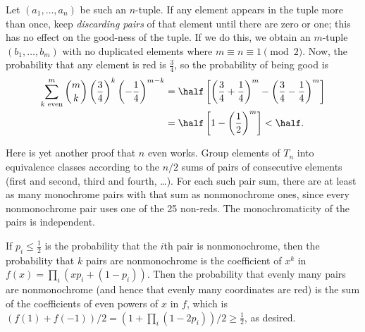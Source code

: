 Let $(a_1, \dots, a_n)$ be such an $n$-tuple.
If any element appears in the tuple more than once,
keep \emph{discarding pairs} of that element until there are zero or one;
this has no effect on the good-ness of the tuple.
If we do this, we obtain an $m$-tuple $(b_1, \dots, b_m)$
with no duplicated elements where $m \equiv n \equiv 1 \pmod 2$.
Now, the probability that any element is red is $\frac34$,
so the probability of being good is
\begin{align*}
  \sum_{k \text{ even}}^m \binom{m}{k} \left( \frac 34 \right)^k
  \left( -\frac 14 \right)^{m-k}
  &= \half\left[ \left( \frac34 + \frac 14 \right)^m
    - \left( \frac 34 - \frac 14 \right)^m \right] \\
  &= \half \left[ 1 - \left( \frac12 \right)^m \right] < \half.
\end{align*}

\begin{remark*}
  Here is yet another proof that $n$ even works.
  Group elements of $T_n$ into equivalence classes
  according to the $n/2$ sums of pairs of consecutive elements
  (first and second, third and fourth, \dots).
  For each such pair sum, there are at least as many monochrome pairs
  with that sum as nonmonochrome ones, since every nonmonochrome pair uses one of the 25 non-reds.
  The monochromaticity of the pairs is independent.

  If $p_i \le \frac12$ is the probability that the $i$th pair is nonmonochrome,
  then the probability that $k$ pairs are nonmonochrome
  is the coefficient of $x^k$ in $f(x) = \prod_i(xp_i+(1-p_i))$.
  Then the probability that evenly many pairs are nonmonochrome
  (and hence that evenly many coordinates are red)
  is the sum of the coefficients of even powers of $x$ in $f$,
  which is $(f(1) + f(-1))/2 = (1 + \prod_i(1-2p_i))/2 \ge \frac12$,
  as desired.
\end{remark*}
